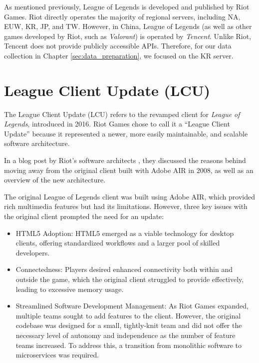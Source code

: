 \documentclass[11pt,a4paper,oneside]{report}
\begin{document}
As mentioned previously, League of Legends is developed and published by Riot Games. Riot directly operates the majority of regional servers, including NA, EUW, KR, JP, and TW. However, in China, League of Legends (as well as other games developed by Riot, such as \textit{Valorant}) is operated by \textit{Tencent}. Unlike Riot, Tencent does not provide publicly accessible APIs. Therefore, for our data collection in Chapter \ref{sec:data_preparation}, we focused on the KR server.

\section{League Client Update (LCU)}
\label{sec:lcu}

The League Client Update (LCU) refers to the revamped client for \textit{League of Legends}, introduced in 2016. Riot Games chose to call it a ``League Client Update'' because it represented a newer, more easily maintainable, and scalable software architecture.

In a blog post by Riot's software architects \cite{mc-veigh-2016}, they discussed the reasons behind moving away from the original client built with Adobe AIR in 2008, as well as an overview of the new architecture.

The original League of Legends client was built using Adobe AIR, which provided rich multimedia features but had its limitations. However, three key issues with the original client prompted the need for an update:

\begin{itemize}
  \item HTML5 Adoption: HTML5 emerged as a viable technology for desktop clients, offering standardized workflows and a larger pool of skilled developers.
  \item Connectedness: Players desired enhanced connectivity both within and outside the game, which the original client struggled to provide effectively, leading to excessive memory usage.
  \item Streamlined Software Development Management: As Riot Games expanded, multiple teams sought to add features to the client. However, the original codebase was designed for a small, tightly-knit team and did not offer the necessary level of autonomy and independence as the number of feature teams increased. To address this, a transition from monolithic software to microservices was required.
\end{itemize}
\end{document}
